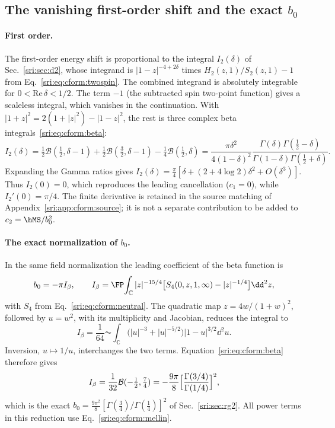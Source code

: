 \subsection{The vanishing first-order shift and the exact \texorpdfstring{$b_0$}{b0}}\label{sri:app:cform:lower}
\paragraph{First order.} The first-order energy shift is proportional to the integral $I_2(\delta)$ of
Sec.~\ref{sri:sec:d2}, whose integrand is $|1-z|^{-4+2\delta}$ times $H_2(z,1)/S_2(z,1)-1$ from
Eq.~\eqref{sri:eq:cform:twospin}. The combined integrand is absolutely integrable for $0<\mathrm{Re}\,\delta<1/2$. The term
$-1$ (the subtracted spin two-point function) gives a scaleless integral, which vanishes in the continuation. With
$|1+z|^2=2(1+|z|^2)-|1-z|^2$, the rest is three complex beta integrals~\eqref{sri:eq:cform:beta}:
\begin{equation}
 I_2(\delta)=\tfrac12\mathcal B(\tfrac12,\delta-1)+\tfrac12\mathcal B(\tfrac32,\delta-1)-\tfrac14\mathcal B(\tfrac12,\delta)
 =\frac{\pi\delta^2}{4(1-\delta)^2}\frac{\Gamma(\delta)\Gamma(\frac12-\delta)}{\Gamma(1-\delta)\Gamma(\frac12+\delta)}.
\end{equation}
Expanding the Gamma ratios gives $I_2(\delta)=\frac\pi4[\delta+(2+4\log2)\delta^2+O(\delta^3)]$. Thus $I_2(0)=0$, which
reproduces the leading cancellation ($c_1=0$), while $I_2'(0)=\pi/4$. The finite derivative is retained in the source
matching of Appendix~\ref{sri:app:cform:source}; it is not a separate contribution to be added to $c_2=\hMS/b_0^2$.

\paragraph{The exact normalization of $b_0$.} In the same field normalization the leading coefficient of the beta
function is
\begin{equation}
 b_0=-\pi I_\beta,\qquad
 I_\beta=\FP\!\int_{\mathbb C}|z|^{-15/4}\bigl[S_4(0,z,1,\infty)-|z|^{-1/4}\bigr]\dd^2z,
 \label{sri:eq:cform:Ibeta}
\end{equation}
with $S_4$ from Eq.~\eqref{sri:eq:cform:neutral}. The quadratic map $z=4w/(1+w)^2$, followed by $u=w^2$, with its
multiplicity and Jacobian, reduces the integral to
\begin{equation}
 I_\beta=\frac1{64}\AC\!\int_{\mathbb C}\bigl(|u|^{-3}+|u|^{-5/2}\bigr)|1-u|^{3/2}\dd^2u.
\end{equation}
Inversion, $u\mapsto1/u$, interchanges the two terms. Equation~\eqref{sri:eq:cform:beta} therefore gives
\begin{equation}
 I_\beta=\frac1{32}\mathcal B(-\tfrac12,\tfrac74)=-\frac{9\pi}{8}\Bigl[\frac{\Gamma(3/4)}{\Gamma(1/4)}\Bigr]^2,
\end{equation}
which is the exact $b_0=\frac{9\pi^2}{8}[\Gamma(\frac34)/\Gamma(\frac14)]^2$ of Sec.~\ref{sri:sec:rg2}. All power terms in
this reduction use Eq.~\eqref{sri:eq:cform:mellin}.

